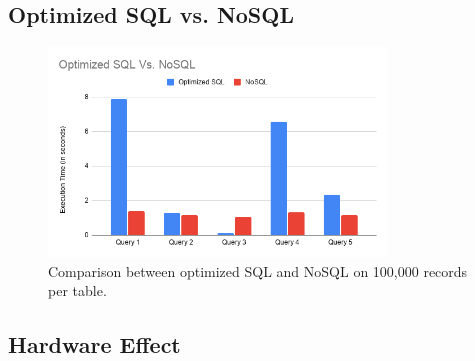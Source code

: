 \subsection{Optimized SQL vs. NoSQL}
\begin{figure}[H]
    \centering
    \includegraphics[width=0.8\textwidth]{images/sql-vs-nosql.png}
    \caption{Comparison between optimized SQL and NoSQL on 100,000 records per table.}
    \label{fig:db-size-2}
\end{figure}

\subsection{Hardware Effect}
